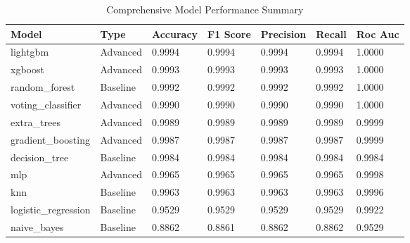 
\begin{table}[htbp]
\centering
\caption{Comprehensive Model Performance Summary}
\label{tab:model_summary}
\begin{tabular}{lllllll}
\toprule
Model & Type & Accuracy & F1 Score & Precision & Recall & Roc Auc \\
\midrule
lightgbm & Advanced & 0.9994 & 0.9994 & 0.9994 & 0.9994 & 1.0000 \\
xgboost & Advanced & 0.9993 & 0.9993 & 0.9993 & 0.9993 & 1.0000 \\
random\_forest & Baseline & 0.9992 & 0.9992 & 0.9992 & 0.9992 & 1.0000 \\
voting\_classifier & Advanced & 0.9990 & 0.9990 & 0.9990 & 0.9990 & 1.0000 \\
extra\_trees & Advanced & 0.9989 & 0.9989 & 0.9989 & 0.9989 & 0.9999 \\
gradient\_boosting & Advanced & 0.9987 & 0.9987 & 0.9987 & 0.9987 & 0.9999 \\
decision\_tree & Baseline & 0.9984 & 0.9984 & 0.9984 & 0.9984 & 0.9984 \\
mlp & Advanced & 0.9965 & 0.9965 & 0.9965 & 0.9965 & 0.9998 \\
knn & Baseline & 0.9963 & 0.9963 & 0.9963 & 0.9963 & 0.9996 \\
logistic\_regression & Baseline & 0.9529 & 0.9529 & 0.9529 & 0.9529 & 0.9922 \\
naive\_bayes & Baseline & 0.8862 & 0.8861 & 0.8862 & 0.8862 & 0.9529 \\
\bottomrule
\end{tabular}
\end{table}
